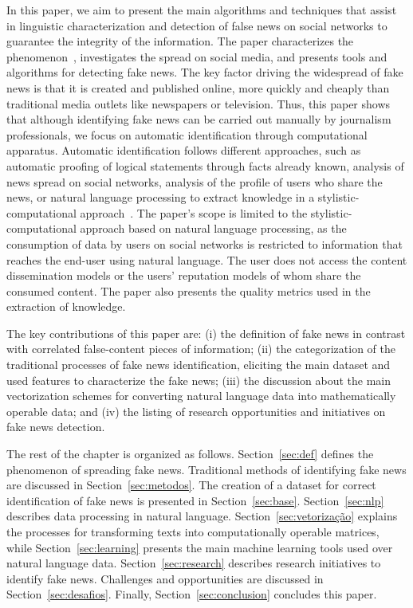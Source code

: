 \documentclass{ieeeaccess}
\begin{document}
In this paper, we aim to present the main algorithms and techniques that assist in linguistic characterization and detection of false news on social networks to guarantee the integrity of the information. The paper characterizes the phenomenon~\cite {rubin2015deception, rubin2015towards}, investigates the spread on social media, and presents tools and algorithms for detecting fake news. 
%
The key factor driving the widespread of fake news is that it is created and published online, more quickly and cheaply than traditional media outlets like newspapers or television. Thus, this paper shows that although identifying fake news can be carried out manually by journalism professionals, we focus on automatic identification through computational apparatus. %
Automatic identification follows different approaches, such as automatic proofing of logical statements through facts already known, analysis of news spread on social networks, analysis of the profile of users who share the news, or natural language processing to extract knowledge in a stylistic-computational approach~\cite{zhou2018fake}. The paper's scope is limited to the stylistic-computational approach based on natural language processing, as the consumption of data by users on social networks  is restricted to information that reaches the end-user using natural language. The user does not access the content dissemination models or the users' reputation models of whom share the consumed content. The paper also presents the quality metrics used in the extraction of knowledge. 

The key contributions of this paper are: (i) the definition of fake news in contrast with correlated false-content pieces of information; (ii) the categorization of the traditional processes of fake news identification, eliciting the main dataset and used features to characterize the fake news; (iii) the discussion about the main vectorization schemes for converting natural language data into mathematically operable data; and (iv) the listing of research opportunities and initiatives on fake news detection.



The rest of the chapter is organized as follows. Section~\ref{sec:def} defines the phenomenon of spreading fake news. Traditional methods of identifying fake news are discussed in Section~\ref{sec:metodos}. The creation of a dataset for correct identification of fake news is presented in Section~\ref{sec:base}. Section~\ref{sec:nlp} describes data processing in natural language. Section~\ref{sec:vetorização} explains the processes for transforming texts into computationally operable matrices, while Section~\ref{sec:learning} presents the main machine learning tools used over natural language data. Section~\ref{sec:research} describes research initiatives to identify fake news. Challenges and opportunities are discussed in Section~\ref{sec:desafios}. Finally,  Section~\ref{sec:conclusion} concludes this paper.
\end{document}
